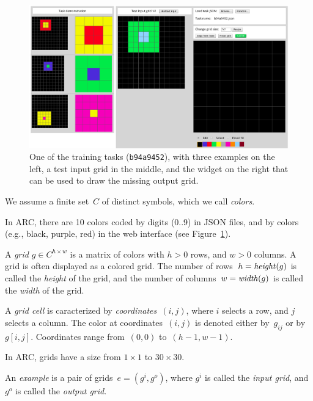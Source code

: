 \documentclass[a4paper]{llncs}
\begin{document}
\begin{figure}[t]
  \centering
  \includegraphics[width=\textwidth]{fig/training_b94a9452.png}
  \caption{One of the training tasks ({\tt b94a9452}), with three
    examples on the left, a test input grid in the middle, and the
    widget on the right that can be used to draw the missing output
    grid.}
  \label{fig:task}
\end{figure}

\begin{definition}[colors]
  We assume a finite set~$C$ of distinct symbols, which we call {\em colors}.
\end{definition}

In ARC, there are 10 colors coded by digits (0..9) in JSON files, and
by colors (e.g., black, purple, red) in the web interface (see
Figure~\ref{fig:task}).

\begin{definition}[grid]
  A {\em grid} $g \in C^{h \times w}$ is a matrix of colors with $h>0$
  rows, and $w>0$ columns. A grid is often displayed as a colored
  grid. The number of rows~$h = {\it height}(g)$ is called the {\em
    height} of the grid, and the number of
  columns~$w = {\it width}(g)$ is called the {\em width} of the grid.
  
  A {\em grid cell} is caracterized by {\em coordinates}~$(i,j)$,
  where $i$ selects a row, and $j$ selects a column. The color at
  coordinates~$(i,j)$ is denoted either by~$g_{ij}$ or by~$g[i,j]$.
  Coordinates range from~$(0,0)$ to~$(h-1,w-1)$.
\end{definition}

In ARC, grids have a size from $1 \times 1$ to $30 \times 30$.

\begin{definition}[example] 
  An {\em example} is a pair of grids~$e = (g^i,g^o)$, where $g^i$ is called
  the {\em input grid}, and $g^o$ is called the {\em output grid}.
\end{definition}
\end{document}

